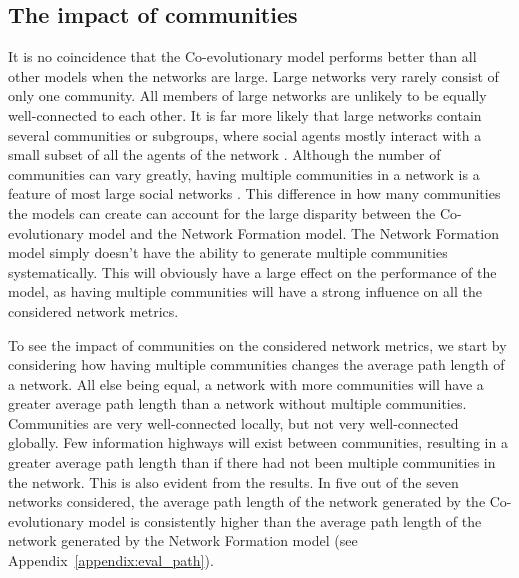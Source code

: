 \documentclass[11pt]{article}
\begin{document}
\subsection{The impact of communities}
It is no coincidence that the Co-evolutionary model performs better than all other models when the networks are large. Large networks very rarely consist of only one community. All members of large networks are unlikely to be equally well-connected to each other. It is far more likely that large networks contain several communities or subgroups, where social agents mostly interact with a small subset of all the agents of the network \cite{backstrom2006group}. 
Although the number of communities can vary greatly, having multiple communities in a network is a feature of most large social networks \cite{backstrom2006group, yang2011detecting}.
This difference in how many communities the models can create can account for the large disparity between the Co-evolutionary model and the Network Formation model. 
The Network Formation model simply doesn't have the ability to generate multiple communities systematically. This will obviously have a large effect on the performance of the model, as having multiple communities will have a strong influence on all the considered network metrics. 

To see the impact of communities on the considered network metrics, we start by considering how having multiple communities changes the average path length of a network. 
All else being equal, a network with more communities will have a greater average path length than a network without multiple communities. 
Communities are very well-connected locally, but not very well-connected globally. 
Few information highways will exist between communities, resulting in a greater average path length than if there had not been multiple communities in the network. 
This is also evident from the results. In five out of the seven networks considered, the average path length of the network generated by the Co-evolutionary model is consistently higher than the average path length of the network generated by the Network Formation model (see Appendix~\ref{appendix:eval_path}).
\end{document}
